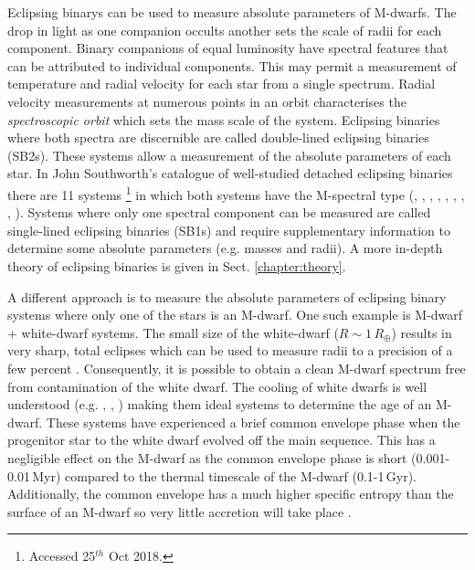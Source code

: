 Eclipsing binarys can be used to measure absolute parameters of M-dwarfs. The drop in light as one companion occults another  sets the scale of radii for each component. Binary companions of equal luminosity have spectral features that can be attributed to individual components. This may permit a measurement of temperature and radial velocity for each star from a single spectrum. Radial velocity measurements at numerous points in an orbit characterises the \textit{spectroscopic orbit} which sets the mass scale of the system. Eclipsing binaries where both spectra are discernible are called double-lined eclipsing binaries (SB2s). These systems allow a measurement of the absolute parameters of each star. In John Southworth's catalogue of well-studied detached eclipsing binaries \citep{2015ASPC..496..164S} there are 11 systems%
\footnote{Accessed 25$^{th}$ Oct 2018.}
%
in which both systems have the M-spectral type (\citealt{2010ApJ...712.1003W}, \citealt{2002ApJ...567.1140T}, \citealt{2011ApJ...728...48K}, \citealt{2018AJ....155..114H}, \citealt{2003A&A...398..239R}, \citealt{2017ApJ...845...72K}, \citealt{2011ApJ...742..123I}, \citealt{2016ApJ...816...21D}, \citealt{2016ApJ...816...21D}). Systems where only one spectral component can be measured are called single-lined eclipsing binaries (SB1s) and require supplementary information to determine some absolute parameters (e.g. masses and radii). A more in-depth theory of eclipsing binaries is given in Sect. \ref{chapter:theory}.

A different approach is to measure the absolute parameters of eclipsing binary systems where only one of the stars is an M-dwarf. One such example is M-dwarf + white-dwarf systems. The small size of the white-dwarf ($R \sim 1\,R_\oplus$) results in very sharp, total eclipses which can be used to measure radii to a precision of a few percent  \citep{2010MNRAS.402.2591P}. Consequently, it is possible to obtain a clean M-dwarf spectrum free from contamination of the white dwarf. The cooling of white dwarfs is well understood (e.g. \citealt{1997ApJ...486..413S}, \citealt{2013A&A...555A..96S}, \citealt{2014Natur.515...88V}) making them ideal systems to determine the age of an M-dwarf. These systems have experienced a brief common envelope phase when the progenitor star to the white dwarf evolved off the main sequence. This has a negligible effect on the M-dwarf as the common envelope phase is short (0.001-0.01\,Myr) compared to the thermal timescale of the M-dwarf (0.1-1\,Gyr). Additionally, the common envelope has a much higher specific entropy than the surface of an M-dwarf so very little accretion will take place \citep{1991ApJ...370..709H}.



